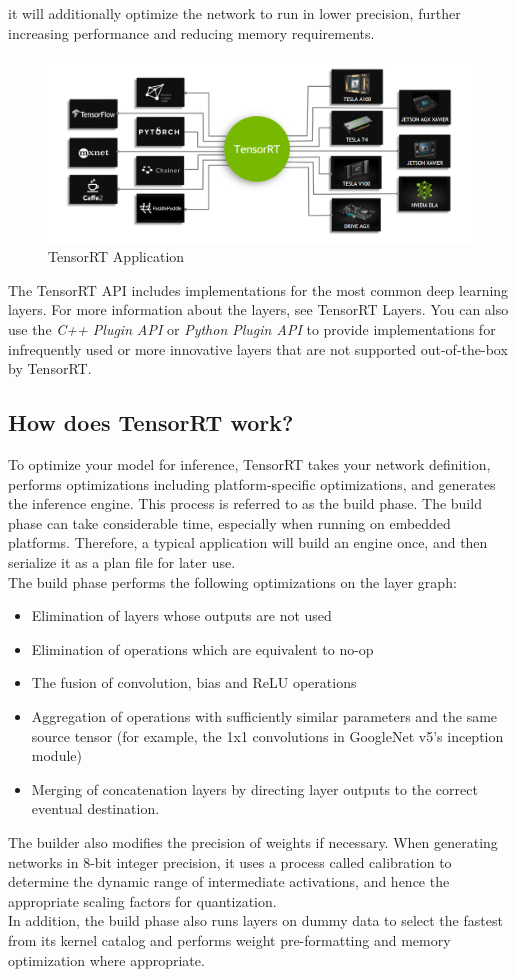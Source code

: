         it will additionally optimize the network to run in lower precision, further increasing performance and reducing memory requirements.
        \begin{figure}[H]
            \centering
            \includegraphics[width=0.6\linewidth]{img/application.png}
            \caption{TensorRT Application}
        \end{figure}
        The TensorRT API includes implementations for the most common deep learning layers. For more information about the layers, see TensorRT Layers. You can also use the \emph{C++ Plugin API} or \emph{Python Plugin API} 
        to provide implementations for infrequently used or more innovative layers that are not supported out-of-the-box by TensorRT. 
    \subsection{How does TensorRT work?}
        To optimize your model for inference, TensorRT takes your network definition, performs optimizations including platform-specific optimizations, and generates the inference engine. This process is referred to as the build phase. 
        The build phase can take considerable time, especially when running on embedded platforms. Therefore, a typical application will build an engine once, and then serialize it as a plan file for later use. \\ 
        \vspace{3mm}
        The build phase performs the following optimizations on the layer graph:
        \begin{itemize}
            \item Elimination of layers whose outputs are not used
            \item Elimination of operations which are equivalent to no-op
            \item The fusion of convolution, bias and ReLU operations
            \item Aggregation of operations with sufficiently similar parameters and the same source tensor (for example, the 1x1 convolutions in GoogleNet v5’s inception module)
            \item Merging of concatenation layers by directing layer outputs to the correct eventual destination.
        \end{itemize}
        The builder also modifies the precision of weights if necessary. When generating networks in 8-bit integer precision, it uses a process called calibration to determine the dynamic range of intermediate activations, 
        and hence the appropriate scaling factors for quantization. \\ 
        \vspace{3mm}
        In addition, the build phase also runs layers on dummy data to select the fastest from its kernel catalog and performs weight pre-formatting and memory optimization where appropriate.
